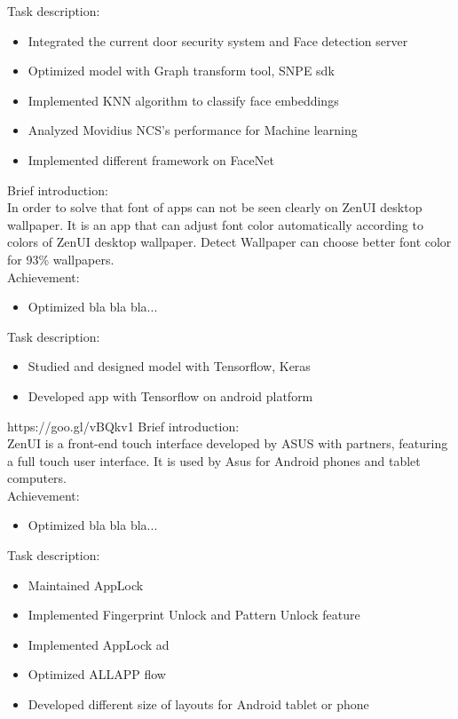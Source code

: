 \documentclass{resume}
\begin{document}
Task description:
\begin{itemize}
  \item Integrated the current door security system and Face detection server
  \item Optimized model with Graph transform tool, SNPE sdk
  \item Implemented KNN algorithm to classify face embeddings
  \item Analyzed Movidius NCS's performance for Machine learning
  \item Implemented different framework on FaceNet
\end{itemize}
 {}
Brief introduction:\\
In order to solve that font of apps can not be seen clearly on ZenUI desktop wallpaper. It is an app that can adjust font color automatically according to colors of ZenUI desktop wallpaper. Detect Wallpaper can choose better font color for 93\% wallpapers.\\
Achievement:
\begin{itemize}
  \item Optimized bla bla bla...
\end{itemize}
Task description:
\begin{itemize}
  \item Studied and designed model with Tensorflow, Keras
  \item Developed app with Tensorflow on android platform 
\end{itemize}

 {https://goo.gl/vBQkv1}
Brief introduction:\\
ZenUI is a front-end touch interface developed by ASUS with partners, featuring a full touch user interface. It is used by Asus for Android phones and tablet computers.\\
Achievement:
\begin{itemize}
  \item Optimized bla bla bla...
\end{itemize}
Task description:
\begin{itemize}
  \item Maintained AppLock
  \item Implemented Fingerprint Unlock and Pattern Unlock feature
  \item Implemented AppLock ad
  \item Optimized ALLAPP flow
  \item Developed different size of layouts for Android tablet or phone
\end{itemize}
\end{document}
